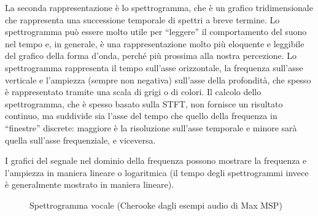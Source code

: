 La seconda rappresentazione è lo spettrogramma, che è un grafico tridimensionale che rappresenta una successione temporale di spettri a breve termine. Lo spettrogramma può essere molto utile per ``leggere'' il comportamento del suono nel tempo e, in generale, è una rappresentazione molto più eloquente e leggibile del grafico della forma d'onda, perché più prossima alla nostra percezione. Lo spettrogramma rappresenta il tempo sull'asse orizzontale, la frequenza sull'asse verticale e l'ampiezza (sempre non negativa) sull'asse della profondità, che spesso è rappresentato tramite una scala di grigi o di colori. Il calcolo dello spettrogramma, che è spesso basato sulla STFT, non fornisce un risultato continuo, ma suddivide sia l'asse del tempo che quello della frequenza in ``finestre'' discrete: maggiore è la risoluzione sull'asse temporale e minore sarà quella sull'asse frequenziale, e viceversa. 

I grafici del segnale nel dominio della frequenza possono mostrare la frequenza e l'ampiezza in maniera lineare o logaritmica (il tempo degli spettrogrammi invece è generalmente mostrato in maniera lineare).

\begin{figure}
    \begin{center}
    \end{center}
    \caption{Spettrogramma vocale (Cherooke dagli esempi audio di Max MSP)}
\end{figure}

